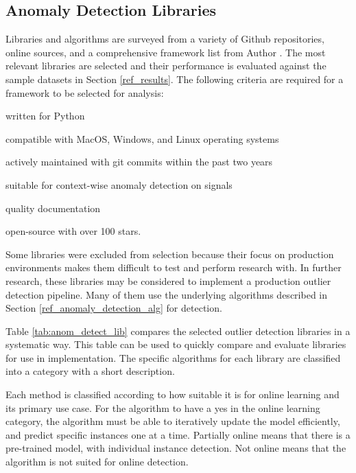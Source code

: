 

\subsection{Anomaly Detection Libraries}
\label{ref_code_libraries}
 Libraries and algorithms are surveyed from a variety of Github repositories, online sources, and a comprehensive framework list from Author \cite{medico2020-ts-list}.
 The most relevant libraries are selected and their performance is evaluated against the sample datasets in Section \ref{ref_results}. The following criteria are required for a framework to be selected for analysis:
 \begin{inlinelist}
     \item written for Python
     \item compatible with MacOS, Windows, and Linux operating systems
     \item actively maintained with git commits within the past two years
     \item suitable for context-wise anomaly detection on signals
     \item quality documentation
     \item open-source with over 100 stars.
 \end{inlinelist}

Some libraries were excluded from selection because their focus on production environments makes them difficult to test and perform research with.
In further research, these libraries may be considered to implement a production outlier detection pipeline.
Many of them use the underlying algorithms described in Section \ref{ref_anomaly_detection_alg} for detection.

Table \ref{tab:anom_detect_lib} compares the selected outlier detection libraries in a systematic way.
This table can be used to quickly compare and evaluate libraries for use in implementation.
The specific algorithms for each library are classified into a category with a short description.

Each method is classified according to how suitable it is for online learning and its primary use case.
For the algorithm to have a yes in the online learning category, the algorithm must be able to iteratively update the model efficiently, and predict specific instances one at a time.
Partially online means that there is a pre-trained model, with individual instance detection.
Not online means that the algorithm is not suited for online detection.

